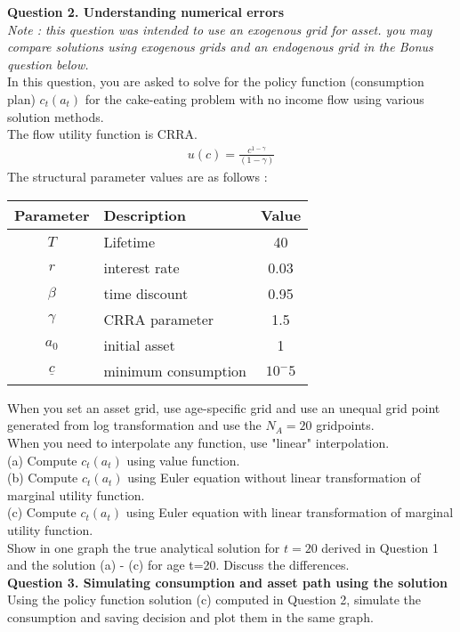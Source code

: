 \documentclass[paper=a4, fontsize=13pt]{extarticle} %
\numberwithin{equation}{section} %
\numberwithin{figure}{section} %
\numberwithin{table}{section} %
\begin{document}
\textbf{Question 2. Understanding numerical errors} \\
\textit{Note : this question was intended to use an exogenous grid for asset. you may compare solutions using exogenous grids and an endogenous grid in the Bonus question below.} \\
In this question, you are asked to solve for the policy function (consumption plan) $c_t(a_t)$ for the cake-eating problem with no income flow using various solution methods. \\
The flow utility function is CRRA.
\begin{gather}
u(c) = \frac{c^{1-\gamma}}{(1-\gamma)}
\end{gather}
The structural parameter values are as follows : \\
\begin{table}[H]
\centering
\begin{tabular}{c l c}
\hline
Parameter & Description & Value \\
\hline
$T$ & Lifetime & 40 \\
$r$ & interest rate & 0.03 \\
$\beta$ & time discount & 0.95 \\
$\gamma$ & CRRA parameter & 1.5 \\
$a_0$ & initial asset & 1 \\
$\underline{c}$ & minimum consumption & $10^-5$ \\
\hline
\end{tabular}
\end{table}
When you set an asset grid, use age-specific grid and use an unequal grid point generated from log transformation and use the $N_A=20$ gridpoints. \\
When you need to interpolate any function, use "linear" interpolation.\\
(a) Compute $c_t(a_t)$ using value function. \\
(b) Compute $c_t(a_t)$ using Euler equation without linear transformation of marginal utility function. \\
(c) Compute $c_t(a_t)$ using Euler equation with linear transformation of marginal utility function. \\

Show in one graph the true analytical solution for $t=20$ derived in Question 1 and the solution (a) - (c) for age t=20. Discuss the differences. \\

\textbf{Question 3. Simulating consumption and asset path using the solution} \\
Using the policy function solution (c) computed in Question 2, simulate the consumption and saving decision and plot them in the same graph. \\
\end{document}
